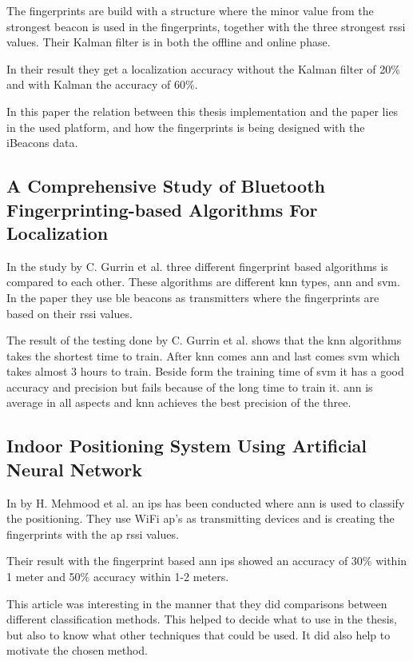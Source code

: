 \bigskip

The fingerprints are build with a structure where the minor value from the strongest beacon is used in the fingerprints, together with the three strongest \acrshort{rssi} values.
Their Kalman filter is in both the offline and online phase.

\bigskip

In their result they get a localization accuracy without the Kalman filter of 20\% and with Kalman the accuracy of 60\%.

\bigskip

In this paper the relation between this thesis implementation and the paper lies in the used platform, and how the fingerprints is being designed with the iBeacons data.


\subsection{A Comprehensive Study of Bluetooth Fingerprinting-based Algorithms For 
Localization}\label{sec:}
In the study \cite{ComprehensiveStudyBluetooth2013} by C. Gurrin et al. three different fingerprint based algorithms is compared to each other.
These algorithms are different \acrshort{knn} types, \acrfull{ann} and \acrfull{svm}.
In the paper they use \acrshort{ble} beacons as transmitters where the fingerprints are based on their \acrshort{rssi} values.

\bigskip

The result of the testing done by C. Gurrin et al. shows that the \acrshort{knn} algorithms takes the shortest time to train.
After \acrshort{knn} comes \acrshort{ann} and last comes \acrshort{svm}  which takes almost 3 hours to train.
Beside form the training time of \acrshort{svm}  it has a good accuracy and precision but fails because of the long time to train it.  \acrshort{ann} is average in all aspects and \acrshort{knn} achieves the best precision of the three.


\subsection{Indoor Positioning System Using Artificial Neural Network}\label{sec:}
In \cite{IndoorPositioningSystem2010} by H. Mehmood et al. an \acrshort{ips} has been conducted where \acrlong{ann} is used to classify the positioning.
They use WiFi \acrshort{ap}'s as transmitting devices and is creating the fingerprints with the \acrshort{ap} \acrshort{rssi} values.

\bigskip

Their result with the fingerprint based \acrshort{ann} \acrshort{ips} showed an accuracy of 30\% within 1 meter and 50\% accuracy within 1-2 meters.

\bigskip

This article was interesting in the manner that they did comparisons between different classification methods.
This helped to decide what to use in the thesis, but also to know what other techniques that could be used.
It did also help to motivate the chosen method.
